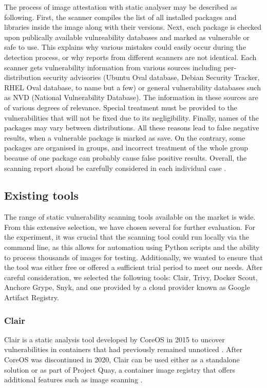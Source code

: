 The process of image attestation with static analyser may be described as following. First, the scanner compiles the list of all installed packages and libraries inside the image along with their versions. Next, each package is checked upon publically available vulnreability databases and marked as vulnerable or safe to use. This explains why various mistakes could easily occur during the detection process, or why reports from different scanners are not identical. Each scanner gets vulnerability information from various sources including per-distribution security advisories (Ubuntu Oval database, Debian Security Tracker, RHEL Oval database, to name but a few) or general vulnerability databases such as NVD (National Vulnerability Database). The information in these sources are of various degrees of relevance. Special treatment must be provided to the vulnerabilities that will not be fixed due to its negligibility. Finally, names of the packages may vary between distributions. All these reasons lead to false negative results, when a vulnerable package is marked as save. On the contrary, some packages are organised in groups, and incorrect treatment of the whole group because of one package can probably cause false positive results. Overall, the scanning report shoud be carefully considered in each individual case \cite{book:rice}.

\clearpage
\subsection{Existing tools}

The range of static vulnerability scanning tools available on the market is wide. From this extensive selection, we have chosen several for further evaluation. For the experiment, it was crucial that the scanning tool could run locally via the command line, as this allows for automation using Python scripts and the ability to process thousands of images for testing. Additionally, we wanted to ensure that the tool was either free or offered a sufficient trial period to meet our needs. After careful consideration, we selected the following tools: Clair, Trivy, Docker Scout, Anchore Grype, Snyk, and one provided by a cloud provider known as Google Artifact Registry.

\subsubsection{Clair}

Clair is a static analysis tool developed by CoreOS in 2015 to uncover vulnerabilities in containers that had previously remained unnoticed \cite{s:clair2015}. After CoreOS was discontinued in 2020, Clair can be used either as a standalone solution or as part of Project Quay, a container image registry that offers additional features such as image scanning \cite{s:what-is-clair}.

